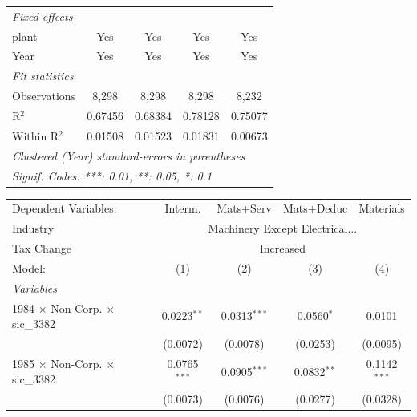 \documentclass[
  12pt]{article}
\theoremstyle{definition}
\theoremstyle{remark}
\begin{document}
\begin{table}
\begin{minipage}{\linewidth}
\begin{tabular}{lcccc}
   \midrule
   \emph{Fixed-effects}\\
   plant                                         & Yes             & Yes             & Yes            & Yes\\  
   Year                                          & Yes             & Yes             & Yes            & Yes\\  
   \midrule
   \emph{Fit statistics}\\
   Observations                                  & 8,298           & 8,298           & 8,298          & 8,232\\  
   R$^2$                                         & 0.67456         & 0.68384         & 0.78128        & 0.75077\\  
   Within R$^2$                                  & 0.01508         & 0.01523         & 0.01831        & 0.00673\\  
   \midrule \midrule
   \multicolumn{5}{l}{\emph{Clustered (Year) standard-errors in parentheses}}\\
   \multicolumn{5}{l}{\emph{Signif. Codes: ***: 0.01, **: 0.05, *: 0.1}}\\
\end{tabular}
\par\endgroup
\begingroup
\centering
\begin{tabular}{lcccc}
   \tabularnewline \midrule \midrule
   Dependent Variables:                          & Interm.        & Mats+Serv      & Mats+Deduc    & Materials\\  
   Industry & \multicolumn{4}{c}{Machinery Except Electrical...} \\ 
   Tax Change & \multicolumn{4}{c}{Increased} \\ 
   Model:                                        & (1)            & (2)            & (3)           & (4)\\  
   \midrule
   \emph{Variables}\\
   1984 $\times$ Non-Corp. $\times$ sic\_3382    & 0.0223$^{**}$  & 0.0313$^{***}$ & 0.0560$^{*}$  & 0.0101\\   
                                                 & (0.0072)       & (0.0078)       & (0.0253)      & (0.0095)\\   
   1985 $\times$ Non-Corp. $\times$ sic\_3382    & 0.0765$^{***}$ & 0.0905$^{***}$ & 0.0832$^{**}$ & 0.1142$^{***}$\\   
                                                 & (0.0073)       & (0.0076)       & (0.0277)      & (0.0328)\\   

\end{tabular}
\end{minipage}
\end{table}
\end{document}
